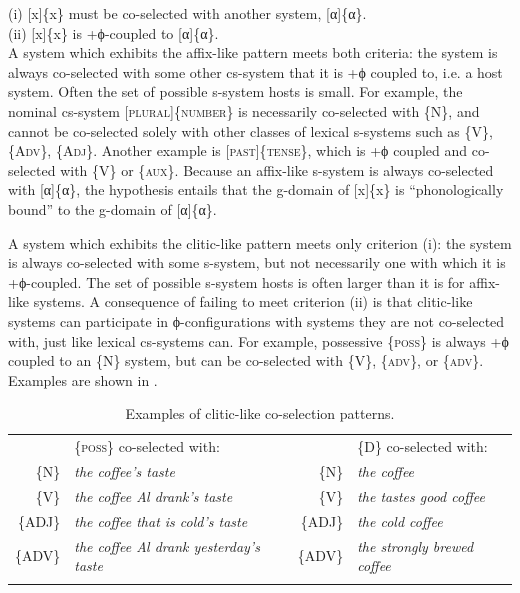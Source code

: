     (i)   [x]\{x\} must be co-selected with another system, [α]\{α\}.\\

    (ii)   [x]\{x\} is +ϕ-coupled to [α]\{α\}.\\

  A system which exhibits the affix-like pattern meets both criteria: the system is always co-selected with some other cs-system that it is +ϕ coupled to, i.e. a host system. Often the set of possible s-system hosts is small. For example, the nominal cs-system [\textsc{plural}]\{\textsc{number}\} is necessarily co-selected with \{N\}, and cannot be co-selected solely with other classes of lexical s-systems such as \{V\}, \{A\textsc{dv}\}, \{A\textsc{dj}\}. Another example is [\textsc{past}]\{\textsc{tense}\}, which is +ϕ coupled and co-selected with \{V\} or \{\textsc{aux}\}. Because an affix-like s-system is always co-selected with [α]\{α\}, the  hypothesis entails that the g-domain of [x]\{x\} is “phonologically bound” to the g-domain of [α]\{α\}. 

  A system which exhibits the clitic-like pattern meets only criterion (i): the system is always co-selected with some s-system, but not necessarily one with which it is +ϕ-coupled. The set of possible s-system hosts is often larger than it is for affix-like systems. A consequence of failing to meet criterion (ii) is that clitic-like systems can participate in ϕ-configurations with systems they are not co-selected with, just like lexical cs-systems can. For example, possessive \{\textsc{poss}\} is always +ϕ coupled to an \{N\} system, but can be co-selected with \{V\}, \{\textsc{adv}\}, or \{\textsc{adv}\}. Examples are shown in {}.

\begin{table}
\begin{tabularx}{\textwidth}{rQrQ}
\lsptoprule                                                                                                                                                                      
 &\{\textsc{poss}\} co-selected with:  & & \{\textsc{D}\} co-selected with: \\
 \{N\}& \textit{the coffee’s taste} &  \{N\} &  \textit{the coffee} \\
 \{V\}& \textit{the coffee Al drank’s taste} &  \{V\} & \textit{the tastes good coffee}  \\
 \{A\textsc{DJ}\} & \textit{the coffee that is cold’s taste} & \{A\textsc{DJ}\} & \textit{the cold coffee} \\
 \{A\textsc{DV}\} &             \textit{the coffee Al drank yesterday’s taste} &        \{A\textsc{DV}\} &         \textit{the strongly brewed coffee}\\
\lspbottomrule
\end{tabularx}
\caption{Examples of clitic-like co-selection patterns.}\label{tab:4:1}
\end{table} 

